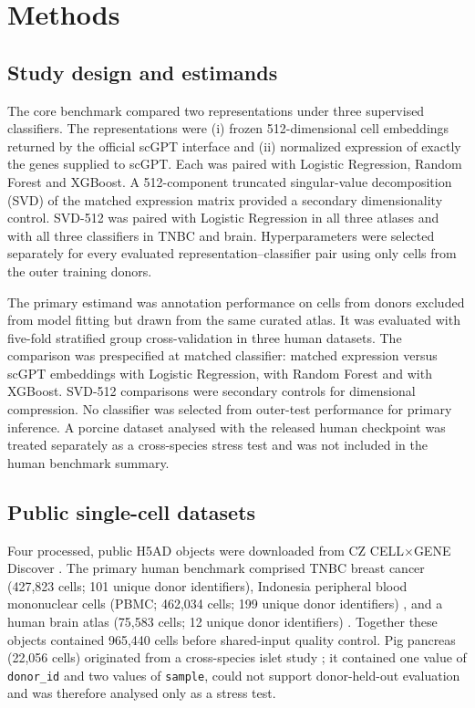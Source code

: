 \section{Methods}

\subsection{Study design and estimands}

The core benchmark compared two representations under three supervised classifiers. The representations were (i) frozen 512-dimensional cell embeddings returned by the official scGPT interface and (ii) normalized expression of exactly the genes supplied to scGPT. Each was paired with Logistic Regression, Random Forest and XGBoost. A 512-component truncated singular-value decomposition (SVD) of the matched expression matrix provided a secondary dimensionality control. SVD-512 was paired with Logistic Regression in all three atlases and with all three classifiers in TNBC and brain. Hyperparameters were selected separately for every evaluated representation--classifier pair using only cells from the outer training donors.

The primary estimand was annotation performance on cells from donors excluded from model fitting but drawn from the same curated atlas. It was evaluated with five-fold stratified group cross-validation in three human datasets. The comparison was prespecified at matched classifier: matched expression versus scGPT embeddings with Logistic Regression, with Random Forest and with XGBoost. SVD-512 comparisons were secondary controls for dimensional compression. No classifier was selected from outer-test performance for primary inference. A porcine dataset analysed with the released human checkpoint was treated separately as a cross-species stress test and was not included in the human benchmark summary.

\subsection{Public single-cell datasets}

Four processed, public H5AD objects were downloaded from CZ CELL$\times$GENE Discover \citep{CZICELLxGENE2023}. The primary human benchmark comprised TNBC breast cancer (427,823 cells; 101 unique donor identifiers), Indonesia peripheral blood mononuclear cells (PBMC; 462,034 cells; 199 unique donor identifiers) \citep{Fachrul2026}, and a human brain atlas (75,583 cells; 12 unique donor identifiers) \citep{Takeuchi2025}. Together these objects contained 965,440 cells before shared-input quality control. Pig pancreas (22,056 cells) originated from a cross-species islet study \citep{Tritschler2022}; it contained one value of \texttt{donor\_id} and two values of \texttt{sample}, could not support donor-held-out evaluation and was therefore analysed only as a stress test.


